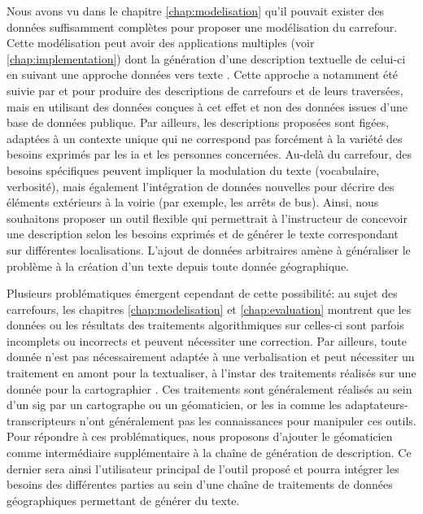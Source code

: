 \label{sec:description_geodata_to_text}

Nous avons vu dans le chapitre \ref{chap:modelisation} qu’il pouvait exister des données suffisamment complètes pour proposer une modélisation du carrefour. Cette modélisation peut avoir des applications multiples (voir \ref{chap:implementation}) dont la génération d’une description textuelle de celui-ci en suivant une approche données vers texte \citep{reiter-2007-architecture}. Cette approche a notamment été suivie par \citet{Guth2019} et \citet{balata2018} pour produire des descriptions de carrefours et de leurs traversées, mais en utilisant des données conçues à cet effet et non des données issues d’une base de données publique. Par ailleurs, les descriptions proposées sont figées, adaptées à un contexte unique qui ne correspond pas forcément à la variété des besoins exprimés par les \gls{ia} et les personnes concernées. Au-delà du carrefour, des besoins spécifiques peuvent impliquer la modulation du texte (vocabulaire, verbosité), mais également l’intégration de données nouvelles pour décrire des éléments extérieurs à la voirie (par exemple, les arrêts de bus). Ainsi, nous souhaitons proposer un outil flexible qui permettrait à l’instructeur de concevoir une description selon les besoins exprimés et de générer le texte correspondant sur différentes localisations. L’ajout de données arbitraires amène à généraliser le problème à la création d’un texte depuis toute donnée géographique.

\newpar{}

Plusieurs problématiques émergent cependant de cette possibilité: au sujet des carrefours, les chapitres \ref{chap:modelisation} et \ref{chap:evaluation} montrent que les données ou les résultats des traitements algorithmiques sur celles-ci sont parfois incomplets ou incorrects et peuvent nécessiter une correction. Par ailleurs, toute donnée n’est pas nécessairement adaptée à une verbalisation et peut nécessiter un traitement en amont pour la textualiser, à l’instar des traitements réalisés sur une donnée pour la cartographier \citep{mackaness2002}. Ces traitements sont généralement réalisés au sein d’un \gls{sig} par un cartographe ou un géomaticien, or les \gls{ia} comme les adaptateurs-transcripteurs n’ont généralement pas les connaissances pour manipuler ces outils. Pour répondre à ces problématiques, nous proposons d’ajouter le géomaticien comme intermédiaire supplémentaire à la chaîne de génération de description. Ce dernier sera ainsi l’utilisateur principal de l’outil proposé et pourra intégrer les besoins des différentes parties au sein d’une chaîne de traitements de données géographiques permettant de générer du texte.

